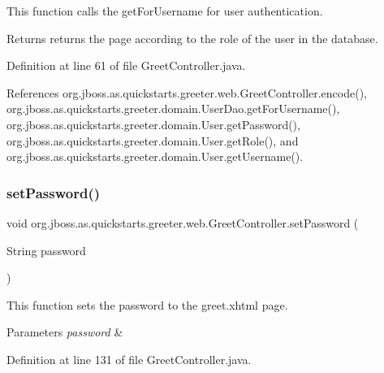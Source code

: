 This function calls the get\+For\+Username for user authentication. 

\begin{DoxyReturn}{Returns}
returns the page according to the role of the user in the database. 
\end{DoxyReturn}


Definition at line 61 of file Greet\+Controller.\+java.



References org.\+jboss.\+as.\+quickstarts.\+greeter.\+web.\+Greet\+Controller.\+encode(), org.\+jboss.\+as.\+quickstarts.\+greeter.\+domain.\+User\+Dao.\+get\+For\+Username(), org.\+jboss.\+as.\+quickstarts.\+greeter.\+domain.\+User.\+get\+Password(), org.\+jboss.\+as.\+quickstarts.\+greeter.\+domain.\+User.\+get\+Role(), and org.\+jboss.\+as.\+quickstarts.\+greeter.\+domain.\+User.\+get\+Username().

\mbox{\label{classorg_1_1jboss_1_1as_1_1quickstarts_1_1greeter_1_1web_1_1_greet_controller_a1e565a4794e7e19e2c3146658c0ee2f2}} 
\subsubsection{\texorpdfstring{set\+Password()}{setPassword()}}
{\footnotesize\ttfamily void org.\+jboss.\+as.\+quickstarts.\+greeter.\+web.\+Greet\+Controller.\+set\+Password (\begin{DoxyParamCaption}\item[{String}]{password }\end{DoxyParamCaption})}



This function sets the password to the greet.\+xhtml page. 


\begin{DoxyParams}{Parameters}
{\em password} & \\
\hline
\end{DoxyParams}


Definition at line 131 of file Greet\+Controller.\+java.



